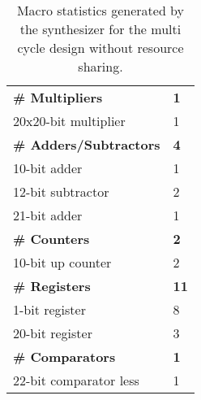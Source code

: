 \documentclass[paper=usletter, fontsize=12pt]{article}
\begin{document}
        \begin{table}[h]
            \caption{Macro statistics generated by the synthesizer for the
            multi cycle design without resource sharing.}
            \label{table:multimacro}
            \centering
            \begin{tabular*}{250pt}{ m{20em}m{1cm} }
                \textbf{\# Multipliers}         & \textbf{1} \\
                 20x20-bit multiplier           & 1 \\
                \textbf{\# Adders/Subtractors}  & \textbf{4} \\
                 10-bit adder                   & 1 \\
                 12-bit subtractor              & 2 \\
                 21-bit adder                   & 1 \\
                \textbf{\# Counters}            & \textbf{2} \\
                 10-bit up counter              & 2 \\
                \textbf{\# Registers}           & \textbf{11} \\
                 1-bit register                 & 8 \\
                 20-bit register                & 3 \\
                \textbf{\# Comparators}         & \textbf{1} \\
                 22-bit comparator less         & 1 \\
            \end{tabular*}

        \end{table}
\end{document}
